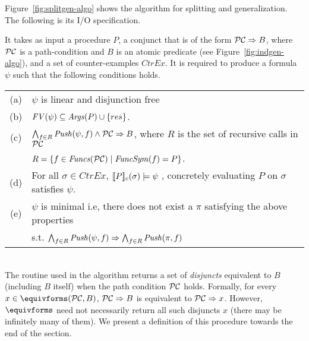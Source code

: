 %
Figure~\ref{fig:splitgen-algo} shows the algorithm for splitting and generalization.
The following is its I/O specification.

It takes as input a procedure $P$, a conjunct that is of the form $\mathcal{PC} \Rightarrow B$, 
where $\mathcal{PC}$ is a path-condition and $B$ is an atomic predicate (see Figure~\ref{fig:indgen-algo}), 
and a set of counter-examples $CtrEx$.
It is required to produce a formula $\psi$ such that the following conditions holds. \\

\begin{tabular}{cl}
(a) & $\psi$ is linear and disjunction free \\

(b) & $\mathit{FV}(\psi) \subseteq \mathit{Args}(P) \cup \{ res \}$. \\

(c) & $\bigwedge_{f \in R} \mathit{Push_{}}(\psi,f) \wedge \mathcal{PC} \Rightarrow B$, 
where $R$ is the set of recursive calls in $\mathcal{PC}$ \\
& \ie{} $R = \{ f \in \mathit{Funcs}(\mathcal{PC}) \; | \; \mathit{FuncSym}(f) = P \}$. \\

(d) & For all $\sigma \in CtrEx$, $[\![P]\!]_c(\sigma) \models \psi$ \ie{}, 
concretely evaluating $P$ on $\sigma$ satisfies $\psi$. \\

(e) & $\psi$ is minimal i.e, there does not exist a $\pi$ satisfying the above properties \\
& s.t. $\bigwedge_{f \in R} \mathit{Push_{}}(\psi,f) \Rightarrow \bigwedge_{f \in R} \mathit{Push_{}}(\pi,f)$  \\
\end{tabular} \\

The routine \equivforms used in the algorithm returns a set of \emph{disjuncts} equivalent to $B$
(including $B$ itself) when the path condition $\mathcal{PC}$ holds. 
Formally, for every $x \in \equivforms(\pathc,B)$, $\mathcal{PC} \Rightarrow B$ is equivalent to $\mathcal{PC} \Rightarrow x$. 
However, $\equivforms$ need not necessarily return all such disjuncts $x$ (there may be infinitely many of them). 
We present a definition of this procedure towards the end of the section.


